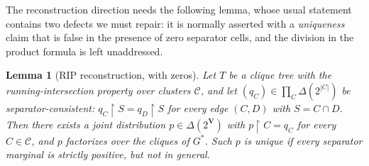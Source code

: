 \documentclass[11pt]{article}
\newtheorem{lemma}{Lemma}
\theoremstyle{definition}
\newcommand{\restr}{\!\restriction\!}
\begin{document}
The reconstruction direction needs the following lemma, whose usual statement
contains two defects we must repair: it is normally asserted with a
\emph{uniqueness} claim that is false in the presence of zero separator cells,
and the division in the product formula is left unaddressed.

\begin{lemma}[RIP reconstruction, with zeros]\label{lem:rip}
Let $T$ be a clique tree with the running-intersection property over clusters
$\mathcal C$, and let $(q_C)\in\prod_C\Delta(2^{|C|})$ be separator-consistent:
$q_C\restr S=q_D\restr S$ for every edge $(C,D)$ with $S=C\cap D$. Then there
exists a joint distribution $p\in\Delta(2^{\mathbf V})$ with $p\restr C=q_C$ for
every $C\in\mathcal C$, and $p$ factorizes over the cliques of $G^\ast$. Such $p$
is unique if every separator marginal is strictly positive, but \emph{not} in
general.
\end{lemma}
\end{document}
